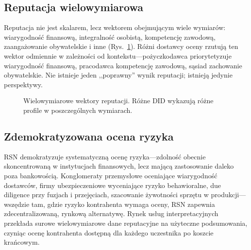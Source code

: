 \documentclass[11pt,a4paper,twocolumn]{article}
\begin{document}
\subsection{Reputacja wielowymiarowa}

Reputacja nie jest skalarem, lecz wektorem obejmującym wiele wymiarów: wiarygodność finansową, integralność osobistą, kompetencję zawodową, zaangażowanie obywatelskie i inne (Rys.~\ref{fig:reputation-radar}). Różni dostawcy oceny rzutują ten wektor odmiennie w zależności od kontekstu---pożyczkodawca priorytetyzuje wiarygodność finansową, pracodawca kompetencję zawodową, sąsiad zachowanie obywatelskie. Nie istnieje jeden ,,poprawny'' wynik reputacji; istnieją jedynie perspektywy.

\begin{figure}[ht]
\centering
{}
\caption{Wielowymiarowe wektory reputacji. Różne DID wykazują różne profile w poszczególnych wymiarach.}
\label{fig:reputation-radar}
\end{figure}

\subsection{Zdemokratyzowana ocena ryzyka}

RSN demokratyzuje systematyczną ocenę ryzyka---zdolność obecnie skoncentrowaną w instytucjach finansowych, lecz mającą zastosowanie daleko poza bankowością. Konglomeraty przemysłowe oceniające wiarygodność dostawców, firmy ubezpieczeniowe wyceniające ryzyko behawioralne, due diligence przy fuzjach i przejęciach, szacowanie żywotności sprzętu w produkcji---wszędzie tam, gdzie ryzyko kontrahenta wymaga oceny, RSN zapewnia zdecentralizowaną, rynkową alternatywę. Rynek usług interpretacyjnych przekłada surowe wielowymiarowe dane reputacyjne na użyteczne podsumowania, czyniąc ocenę kontrahenta dostępną dla każdego uczestnika po koszcie krańcowym.
\end{document}
